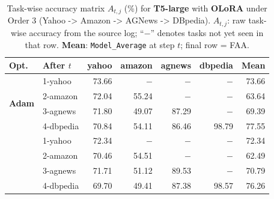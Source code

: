 \begin{table}[ht]
\centering
\caption{%
  Task-wise accuracy matrix $A_{t,j}$ (\%) for \textbf{T5-large} with \textbf{OLoRA} under Order 3 (Yahoo -> Amazon -> AGNews -> DBpedia).
  $A_{t,j}$: raw task-wise accuracy from the source log; ``$-$'' denotes tasks not yet seen in that row.
  \textbf{Mean}: \texttt{Model\_Average} at step $t$; final row = FAA.
}
\label{tab:nlp_o3_t5large_olora}
\setlength{\tabcolsep}{4.0pt}
\renewcommand{\arraystretch}{0.92}
\scriptsize
\begin{tabular}{@{}l l r r r r r@{}}
\toprule
\textbf{Opt.} & \textbf{After $t$} & \textbf{yahoo} & \textbf{amazon} & \textbf{agnews} & \textbf{dbpedia} & \textbf{Mean} \\
\midrule
\multirow{4}{*}{\textbf{Adam}} & 1-yahoo & 73.66 & $-$ & $-$ & $-$ & 73.66 \\
 & 2-amazon & 72.04 & 55.24 & $-$ & $-$ & 63.64 \\
 & 3-agnews & 71.80 & 49.07 & 87.29 & $-$ & 69.39 \\
 & 4-dbpedia & 70.84 & 54.11 & 86.46 & 98.79 & 77.55 \\
\addlinespace[2pt]
\multirow{4}{*}{\textbf{SAM}} & 1-yahoo & 72.34 & $-$ & $-$ & $-$ & 72.34 \\
 & 2-amazon & 70.46 & 54.51 & $-$ & $-$ & 62.49 \\
 & 3-agnews & 71.71 & 51.12 & 89.53 & $-$ & 70.79 \\
 & 4-dbpedia & 69.70 & 49.41 & 87.38 & 98.57 & 76.26 \\
\bottomrule
\end{tabular}
\end{table}

